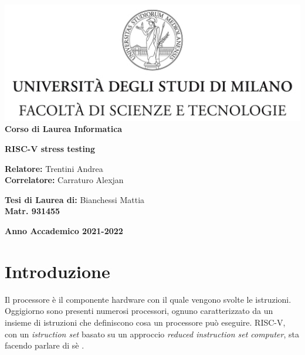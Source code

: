 \documentclass[12pt, a4paper]{report}
\begin{document}
\begin{titlepage}
\begin{center}
\includegraphics[width=\textwidth]{Img/Logo.jpg}\\
{\large{\bf Corso di Laurea Informatica}}
\end{center}
\vspace{12mm}
\begin{center}

\vspace{4mm}
{\huge{\bf RISC-V stress testing}}\\
\vspace{4mm}

\end{center}
\vspace{12mm}
\begin{flushleft}
{\large{\bf Relatore:}}
{\large{Trentini Andrea}}\\
\vspace{4mm}
{\large{\bf Correlatore:}}
{\large{Carraturo Alexjan}}\\
\end{flushleft}
\vspace{12mm}
\begin{flushright}
{\large{\bf Tesi di Laurea di:}}
{\large{Bianchessi Mattia}}\\
{\large{\bf Matr. 931455}}\\
\end{flushright}
\vspace{4mm}
\begin{center}
{\large{\bf Anno Accademico 2021-2022}}
\end{center}
\end{titlepage}


\listoftodos


\tableofcontents
\listoffigures
\listoftables
\lstlistoflistings



\chapter{Introduzione}
Il processore è il componente hardware con il quale vengono svolte le istruzioni.
Oggigiorno sono presenti numerosi processori, ognuno caratterizzato da un insieme di istruzioni che definiscono  cosa un processore può eseguire. RISC-V, con un \textit{istruction set} basato su un approccio \textit{reduced instruction set computer}\cite{RISCOverview}, sta facendo parlare di sè \cite{RISCVHistory}.
\end{document}

